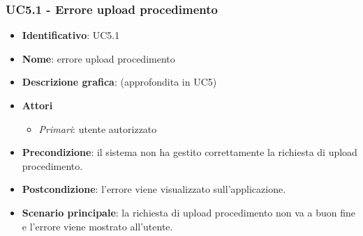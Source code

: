 \subsubsection{UC5.1 - Errore upload procedimento}
\begin{itemize}
  \item \textbf{Identificativo}: UC5.1
  \item \textbf{Nome}: errore upload procedimento
  \item \textbf{Descrizione grafica}: (approfondita in UC5)
  \item \textbf{Attori}
        \begin{itemize}
          \item \textit{Primari}: utente autorizzato
        \end{itemize}
  \item \textbf{Precondizione}: il sistema non ha gestito correttamente la richiesta di upload procedimento.
  \item \textbf{Postcondizione}: l'errore viene visualizzato sull'applicazione.
  \item \textbf{Scenario principale}: la richiesta di upload procedimento non va a buon fine e l'errore viene mostrato all'utente.
\end{itemize}
